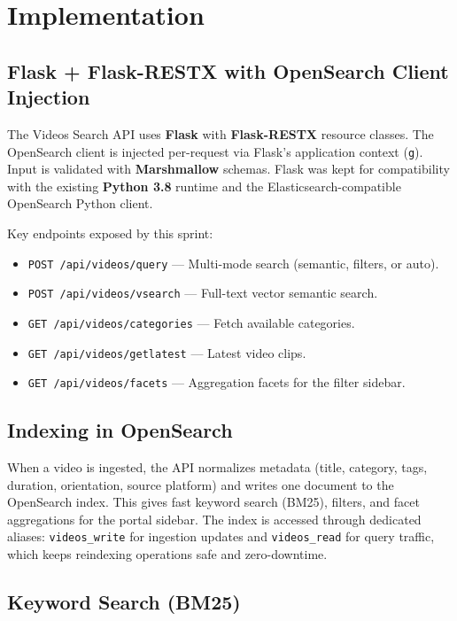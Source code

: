 \section{Implementation}

\subsection{Flask + Flask-RESTX with OpenSearch Client Injection}

The Videos Search API uses \textbf{Flask} with \textbf{Flask-RESTX} resource classes. The
OpenSearch client is injected per-request via Flask's application context (\texttt{g}). Input is
validated with \textbf{Marshmallow} schemas. Flask was kept for compatibility with the existing
\textbf{Python 3.8} runtime and the Elasticsearch-compatible OpenSearch Python client.

Key endpoints exposed by this sprint:

\begin{itemize}
  \item \texttt{POST /api/videos/query} — Multi-mode search (semantic, filters, or auto).
  \item \texttt{POST /api/videos/vsearch} — Full-text vector semantic search.
  \item \texttt{GET /api/videos/categories} — Fetch available categories.
  \item \texttt{GET /api/videos/getlatest} — Latest video clips.
  \item \texttt{GET /api/videos/facets} — Aggregation facets for the filter sidebar.
\end{itemize}

\subsection{Indexing in OpenSearch}

When a video is ingested, the API normalizes metadata (title, category, tags, duration,
orientation, source platform) and writes one document to the OpenSearch index. This gives fast
keyword search (BM25), filters, and facet aggregations for the portal sidebar. The index is
accessed through dedicated aliases: \texttt{videos\_write} for ingestion updates and
\texttt{videos\_read} for query traffic, which keeps reindexing operations safe and
zero-downtime.

\subsection{Keyword Search (BM25)}


